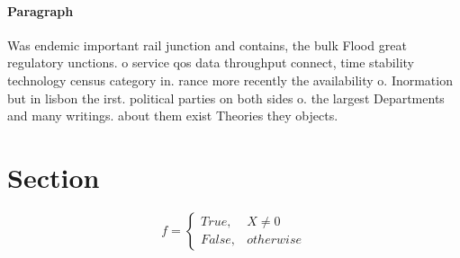 \documentclass[a4paper]{article}
\begin{document}
\paragraph{Paragraph}
Was endemic important rail junction and contains, the bulk Flood great regulatory unctions. o service qos data throughput connect, time stability technology census category in. rance more recently the availability o. Inormation but in lisbon the irst. political parties on both sides o. the largest Departments and many writings. about them exist Theories they objects.


\section{Section}

\begin{equation}   f =
\begin{cases} True, & X \neq 0\\
False, & otherwise
\end{cases}
\end{equation}
\end{document}
